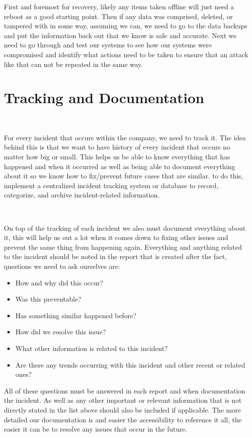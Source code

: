 \documentclass[12pt,a4paper]{report}
\begin{document}
First and foremost for recovery, likely any items taken offline will just need a reboot as a good starting point.
Then if any data was comprised, deleted, or tampered with in some way, assuming we can, we need to go to the data backups and put the information back out that we know is safe and accurate.
Next we need to go through and test our systems to see how our systems were compromised and identify what actions need to be taken to ensure that an attack like that can not be repeated in the same way.

\section{Tracking and Documentation}
\

For every incident that occurs within the company, we need to track it.
The idea behind this is that we want to have history of every incident that occurs no matter how big or small.
This helps us be able to know everything that has happened and when it occurred as well as being able to document everything about it so we know how to fix/prevent future cases that are similar.
to do this, implement a centralized incident tracking system or database to record, categorize, and archive incident-related information.

\

On top of the tracking of each incident we also must document everything about it, this will help us out a lot when it comes down to fixing other issues and prevent the same thing from happening again.
Everything and anything related to the incident should be noted in the report that is created after the fact, questions we need to ask ourselves are:
\begin{itemize}
 \item How and why did this occur?
 \item Was this preventable?
 \item Has something similar happened before?
 \item How did we resolve this issue?
 \item What other information is related to this incident?
 \item Are there any trends occurring with this incident and other recent or related ones?
\end{itemize}

All of these questions must be answered in each report and when documentation the incident.
As well as any other important or relevant information that is not directly stated in the list above should also be included if applicable.
The more detailed our documentation is and easier the accessibility to reference it all, the easier it can be to resolve any issues that occur in the future.
\end{document}
